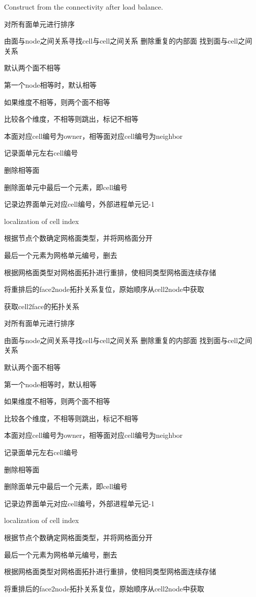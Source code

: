 Construct from the connectivity after load balance. 

对所有面单元进行排序

由面与node之间关系寻找cell与cell之间关系 删除重复的内部面 找到面与cell之间关系

默认两个面不相等

第一个node相等时，默认相等

如果维度不相等，则两个面不相等

比较各个维度，不相等则跳出，标记不相等

本面对应cell编号为owner，相等面对应cell编号为neighbor

记录面单元左右cell编号

删除相等面

删除面单元中最后一个元素，即cell编号

记录边界面单元对应cell编号，外部进程单元记-\/1

localization of cell index

根据节点个数确定网格面类型，并将网格面分开

最后一个元素为网格单元编号，删去

根据网格面类型对网格面拓扑进行重排，使相同类型网格面连续存储

将重排后的face2node拓扑关系复位，原始顺序从cell2node中获取

获取cell2face的拓扑关系

对所有面单元进行排序

由面与node之间关系寻找cell与cell之间关系 删除重复的内部面 找到面与cell之间关系

默认两个面不相等

第一个node相等时，默认相等

如果维度不相等，则两个面不相等

比较各个维度，不相等则跳出，标记不相等

本面对应cell编号为owner，相等面对应cell编号为neighbor

记录面单元左右cell编号

删除相等面

删除面单元中最后一个元素，即cell编号

记录边界面单元对应cell编号，外部进程单元记-\/1

localization of cell index

根据节点个数确定网格面类型，并将网格面分开

最后一个元素为网格单元编号，删去

根据网格面类型对网格面拓扑进行重排，使相同类型网格面连续存储

将重排后的face2node拓扑关系复位，原始顺序从cell2node中获取

